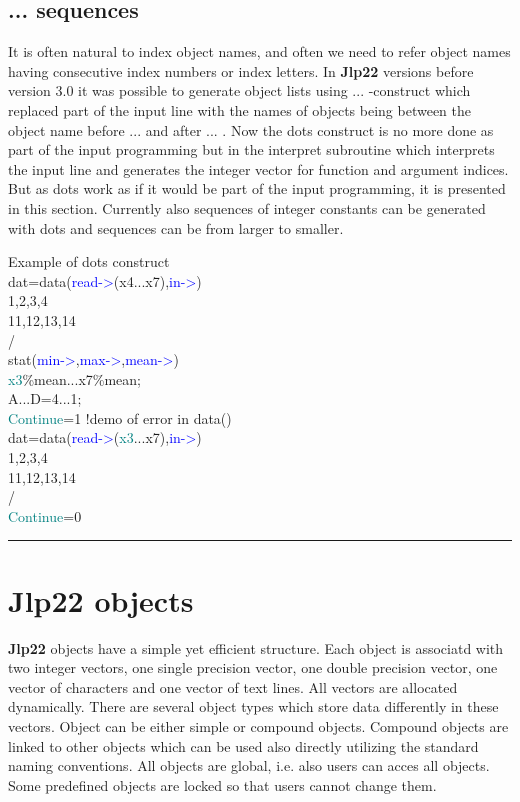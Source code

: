\subsection{...  sequences} 
\label{dots} 
It is often natural to index object names, and often we need to refer object 
names having consecutive index numbers or index letters. In \textbf{Jlp22} versions before version 3.0 it 
was possible to generate object lists using ... -construct which replaced part of 
the input line with the names of objects being between the object 
name before ... and after ... . Now the dots construct is no more done as 
part of the input programming but in the interpret subroutine which interprets the 
input line and generates the integer vector for function and argument indices. 
But as dots work as if it would be part of the input programming, it is presented in this 
section. Currently also sequences of integer constants can be generated with dots and 
sequences can be from larger to smaller. 
\singlespacing 
\begin{example}[dotsex]Example of dots construct\\ 
\label{dotsex} 
\noindent dat=\textcolor{VioletRed}{data}(\textcolor{blue}{read->}(x4...x7),\textcolor{blue}{in->})\\ 
1,2,3,4\\ 
11,12,13,14\\ 
/          \\ 
\textcolor{VioletRed}{stat}(\textcolor{blue}{min->},\textcolor{blue}{max->},\textcolor{blue}{mean->})\\ 
\textcolor{teal}{x3}\%mean...x7\%mean;\\ 
A...D=4...1;\\ 
\textcolor{teal}{Continue}=1\,\,{\color{ForestGreen}!demo of error in data()}\\ 
dat=\textcolor{VioletRed}{data}(\textcolor{blue}{read->}(\textcolor{teal}{x3}...x7),\textcolor{blue}{in->})\\ 
1,2,3,4\\ 
11,12,13,14\\ 
/          \\ 
\textcolor{teal}{Continue}=0\\ 
\end{example} 
\vspace{-7mm} \rule{5cm}{0.1pt} 
\onehalfspacing 
\section{\textbf{Jlp22} objects} 
\label{objintro} 
\textbf{Jlp22} objects have a simple yet efficient structure. Each object is associatd with two integer vectors, one single precision vector, one double precision vector, 
one vector of characters and one vector of text lines. All vectors are allocated dynamically. 
There are several object types which store data differently in these vectors. 
Object can be either simple or compound objects. Compound objects are linked to other 
objects which can be used also directly utilizing the standard naming conventions. All objects are 
global, i.e. also users can acces all objects. Some predefined objects are locked so that 
users cannot change them. 
 
